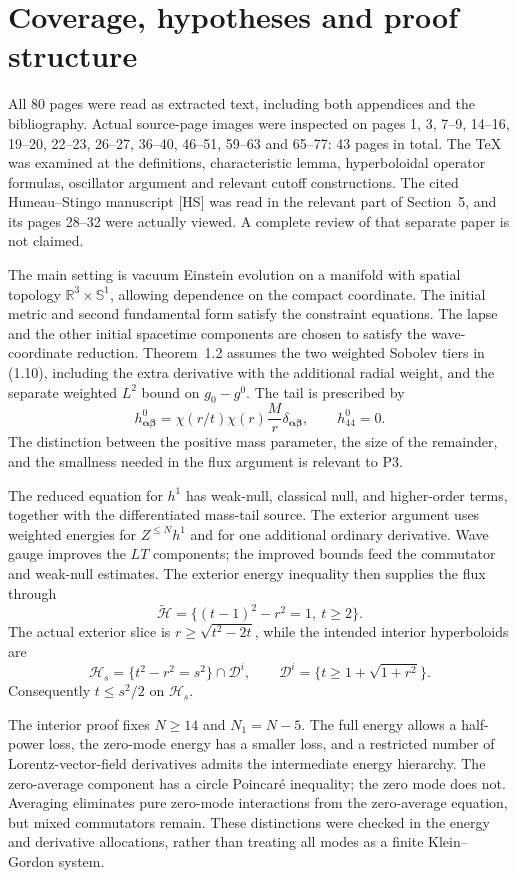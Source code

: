 \documentclass[10pt]{article}
\begin{document}
\section*{Coverage, hypotheses and proof structure}
All 80 pages were read as extracted text, including both appendices and the bibliography. Actual source-page images were inspected on pages 1, 3, 7–9, 14–16, 19–20, 22–23, 26–27, 36–40, 46–51, 59–63 and 65–77: 43 pages in total. The TeX was examined at the definitions, characteristic lemma, hyperboloidal operator formulas, oscillator argument and relevant cutoff constructions. The cited Huneau–Stingo manuscript [HS] was read in the relevant part of Section 5, and its pages 28–32 were actually viewed. A complete review of that separate paper is not claimed.\par
The main setting is vacuum Einstein evolution on a manifold with spatial topology \(\mathbb R^3\times\mathbb S^1\), allowing dependence on the compact coordinate. The initial metric and second fundamental form satisfy the constraint equations. The lapse and the other initial spacetime components are chosen to satisfy the wave-coordinate reduction. Theorem 1.2 assumes the two weighted Sobolev tiers in (1.10), including the extra derivative with the additional radial weight, and the separate weighted \(L^2\) bound on \(g_0-g^0\). The tail is prescribed by \[h^0_{\boldsymbol\alpha\boldsymbol\beta}
 =\chi(r/t)\chi(r)\frac{M}{r}\delta_{\boldsymbol\alpha\boldsymbol\beta},
 \qquad h^0_{44}=0.\] The distinction between the positive mass parameter, the size of the remainder, and the smallness needed in the flux argument is relevant to P3.\par
The reduced equation for \(h^1\) has weak-null, classical null, and higher-order terms, together with the differentiated mass-tail source. The exterior argument uses weighted energies for \(Z^{\leq N}h^1\) and for one additional ordinary derivative. Wave gauge improves the \(LT\) components; the improved bounds feed the commutator and weak-null estimates. The exterior energy inequality then supplies the flux through \[\widetilde{\mathcal H}=\{(t-1)^2-r^2=1,\ t\geq2\}.\] The actual exterior slice is \(r\geq\sqrt{t^2-2t}\), while the intended interior hyperboloids are \[\mathcal H_s=\{t^2-r^2=s^2\}\cap\mathcal D^i,
 \qquad
 \mathcal D^i=\{t\geq1+\sqrt{1+r^2}\}.\] Consequently \(t\leq s^2/2\) on \(\mathcal H_s\).\par
The interior proof fixes \(N\geq14\) and \(N_1=N-5\). The full energy allows a half-power loss, the zero-mode energy has a smaller loss, and a restricted number of Lorentz-vector-field derivatives admits the intermediate energy hierarchy. The zero-average component has a circle Poincaré inequality; the zero mode does not. Averaging eliminates pure zero-mode interactions from the zero-average equation, but mixed commutators remain. These distinctions were checked in the energy and derivative allocations, rather than treating all modes as a finite Klein–Gordon system.\par
\end{document}
